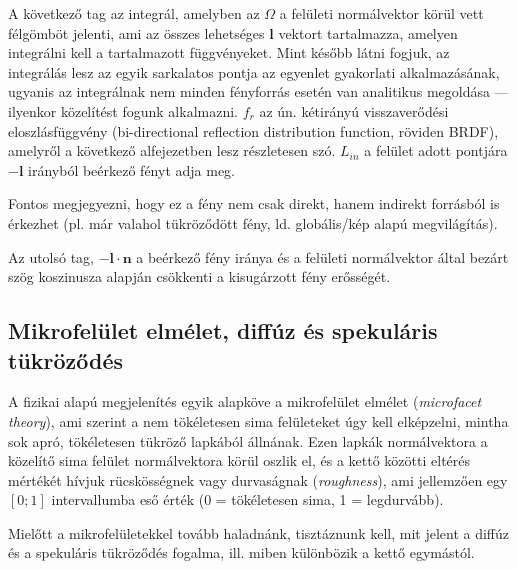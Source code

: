 A következő tag az integrál, amelyben az \(\Omega\) a felületi normálvektor körül vett félgömböt jelenti, ami az összes lehetséges \(\mathbf{l}\) vektort tartalmazza, amelyen integrálni kell a tartalmazott függvényeket. Mint később látni fogjuk, az integrálás lesz az egyik sarkalatos pontja az egyenlet gyakorlati alkalmazásának, ugyanis az integrálnak nem minden fényforrás esetén van analitikus megoldása --- ilyenkor közelítést fogunk alkalmazni. \(f_r\) az ún. kétirányú visszaverődési eloszlásfüggvény (bi-directional reflection distribution function, röviden BRDF), amelyről a következő alfejezetben lesz részletesen szó. \(L_{in}\) a felület adott pontjára \(-\mathbf{l}\) irányból beérkező fényt adja meg.

Fontos megjegyezni, hogy ez a fény nem csak direkt, hanem indirekt forrásból is érkezhet (pl. már valahol tükröződött fény, ld. globális/kép alapú megvilágítás).

Az utolsó tag, \(-\mathbf{l} \cdot \mathbf{n}\) a beérkező fény iránya és a felületi normálvektor által bezárt szög koszinusza alapján csökkenti a kisugárzott fény erősségét.

\subsection{Mikrofelület elmélet, diffúz és spekuláris tükröződés}

A fizikai alapú megjelenítés egyik alapköve a mikrofelület elmélet (\textit{microfacet theory}), ami szerint a nem tökéletesen sima felületeket úgy kell elképzelni, mintha sok apró, tökéletesen tükröző lapkából állnának. Ezen lapkák normálvektora a közelítő sima felület normálvektora körül oszlik el, és a kettő közötti eltérés mértékét hívjuk rücskösségnek vagy durvaságnak (\textit{roughness}), ami jellemzően egy \([0; 1]\) intervallumba eső érték (0 = tökéletesen sima, 1 = legdurvább).

Mielőtt a mikrofelületekkel tovább haladnánk, tisztáznunk kell, mit jelent a diffúz és a spekuláris tükröződés fogalma, ill. miben különbözik a kettő egymástól.

